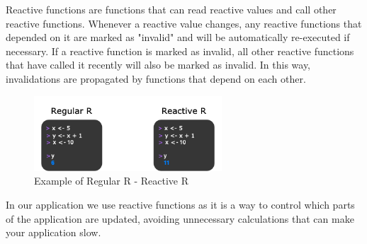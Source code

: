 Reactive functions are functions that can read reactive values and call other reactive functions. Whenever a reactive value changes, any reactive functions that depended on it are marked as "invalid" and will be automatically re-executed if necessary. If a reactive function is marked as invalid, all other reactive functions that have called it recently will also be marked as invalid. In this way, invalidations are propagated by functions that depend on each other.
\begin{figure}[h]
\centering %
\includegraphics[width=7cm]{images/react.png} 

\caption{Example of Regular R - Reactive R}
\label{figura:qualquernome}
\end{figure}

In our application we use reactive functions as it is a way to control which parts of the application are updated, avoiding unnecessary calculations that can make your application slow.